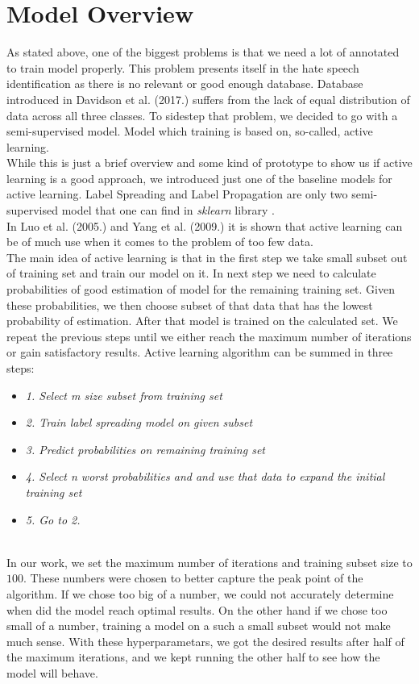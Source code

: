 \documentclass[10pt, a4paper]{article}
\begin{document}
\section{Model Overview}
As stated above, one of the biggest problems is that we need a lot of annotated to train model properly. This problem presents itself in the hate speech identification as there is no relevant or good enough database. Database introduced in Davidson et al. (2017.) suffers from the lack of equal distribution of data across all three classes. To sidestep that problem, we decided to go with a semi-supervised model. Model which training is based on, so-called, active learning.
\\While this is just a brief overview and some kind of prototype to show us if active learning is a good approach, we introduced just one of the baseline models for active learning. Label Spreading and Label Propagation are only two semi-supervised model that one can find in \textit{sklearn} library \citep{scikit-learn}.
\\In Luo et al. (2005.) and Yang et al. (2009.) it is shown that active learning can be of much use when it comes to the problem of too few data.
\\The main idea of active learning is that in the first step we take small subset out of training set and train our model on it. In next step we need to calculate probabilities of good estimation of model for the remaining training set. Given these probabilities, we then choose subset of that data that has the lowest probability of estimation. After that model is trained on the calculated set. We repeat the previous steps until we either reach the maximum number of iterations or gain satisfactory results.
Active learning algorithm can be summed in three steps:
\begin{itemize}
	\item \textit{1. Select m size subset from training set}
	\item \textit{2. Train label spreading model on given subset}
	\item \textit{3. Predict probabilities on remaining training set}
	\item \textit{4. Select n worst probabilities and and use that data to expand the initial training set}
	\item \textit{5. Go to 2.}
\end{itemize}
\\In our work, we set the maximum number of iterations and training subset size to $100$. These numbers were chosen to better capture the peak point of the algorithm. If we chose too big of a number, we could not accurately determine when did the model reach optimal results. On the other hand if we chose too small of a number, training a model on a such a small subset would not make much sense. With these hyperparametars, we got the desired results after half of the maximum iterations, and we kept running the other half to see how the model will behave.
\end{document}
